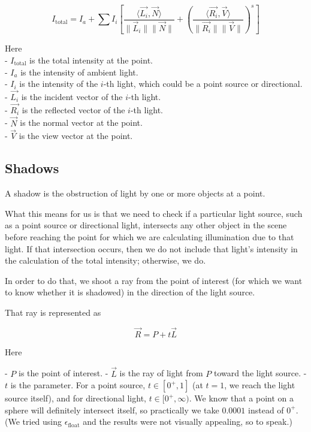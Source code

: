\documentclass[conference]{IEEEtran}
\begin{document}
\begin{equation}
    {I_{\text{total}} = I_a + \sum I_i \left[ \frac{\langle \vec{L_i}, \vec{N} \rangle}{\|\vec{L}_i\| \|\vec{N}\|} + \left( \frac{\langle \vec{R_i}, \vec{V} \rangle}{\|\vec{R_i}\| \|\vec{V}\|} \right)^s \right]}
    \label{combined}
\end{equation}

Here\\
- $I_{\text{total}}$ is the total intensity at the point.\\
- $I_a$ is the intensity of ambient light.\\
- $I_i$ is the intensity of the $i$-th light, which could be a point source or directional.\\
- $\vec{L_i}$ is the incident vector of the $i$-th light.\\
- $\vec{R_i}$ is the reflected vector of the $i$-th light.\\
- $\vec{N}$ is the normal vector at the point.\\
- $\vec{V}$ is the view vector at the point.\\

\subsection{Shadows }

A shadow is the obstruction of light by one or more objects at a point.

What this means for us is that we need to check if a particular light source, such as a point source or directional light, intersects any other object in the scene before reaching the point for which we are calculating illumination due to that light. If that intersection occurs, then we do not include that light's intensity in the calculation of the total intensity; otherwise, we do.

In order to do that, we shoot a ray from the point of interest (for which we want to know whether it is shadowed) in the direction of the light source.

That ray is represented as 

$$\vec{R} = P + t \vec{L}$$

Here

- $P$ is the point of interest.
- $\vec{L}$ is the ray of light from $P$ toward the light source.
- $t$ is the parameter. For a point source, $t \in [0^+, 1]$ (at $t = 1$, we reach the light source itself), and for directional light, $t \in [0^+, \infty)$. We know that a point on a sphere will definitely intersect itself, so practically we take $0.0001$ instead of $0^+$. (We tried using $\epsilon_{\text{float}}$ and the results were not visually appealing, so to speak.)
\end{document}
